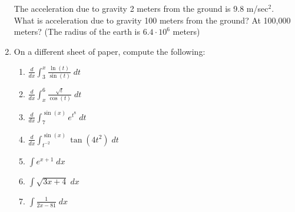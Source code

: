 \documentclass[11pt]{article}
\newcommand{\ds}{\displaystyle}
\begin{document}
\begin{enumerate}
  The acceleration due to gravity 2 meters from the ground is 9.8
  m/sec$^2$.  What is acceleration due to gravity 100 meters from the
  ground? At 100,000 meters? (The radius of the earth is $6.4\cdot
  10^6$ meters)

  \newpage

\item On a different sheet of paper, compute the following:
  \begin{enumerate}
  \item $\ds\frac{d}{dx}\int_3^x \frac{\ln(t)}{\sin(t)}\;dt$ \vfill
  \item $\ds\frac{d}{dx}\int_x^6 \frac{\sqrt{t}}{\cos(t)}\;dt$ \vfill
  \item $\ds\frac{d}{dx}\int_7^{\sin(x)} e^{t^8}\;dt$ \vfill
  \item $\ds\frac{d}{dx}\int_{t^{-2}}^{\sin(x)} \tan(4t^2)\;dt$ \vfill
  \item $\ds\int e^{x+1}\; dx$ \vfill
  \item $\ds\int \sqrt{3x+4}\; dx$ \vfill
  \item $\ds\int \frac{1}{2x-81}\; dx$ \vfill
  \end{enumerate}

\end{enumerate}
\end{document}
